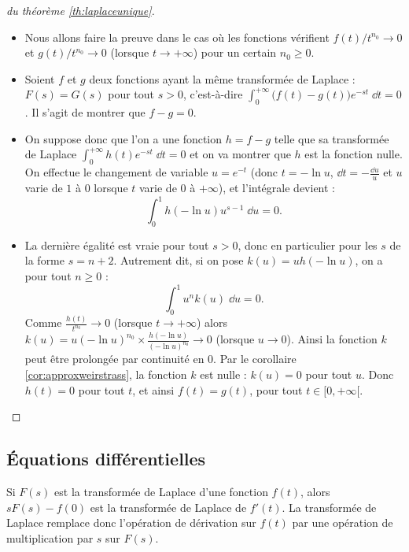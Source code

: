 \documentclass[class=report,crop=false]{standalone}
\begin{document}
\begin{proof}[du théorème \ref{th:laplaceunique}]
\begin{itemize}
  \item Nous allons faire la preuve dans le cas où les fonctions vérifient
  $f(t)/t^{n_0} \to 0$ et $g(t)/t^{n_0} \to 0$ (lorsque $t\to+\infty$) 
  pour un certain $n_0\ge0$.

  \item Soient $f$ et $g$ deux fonctions ayant la même transformée de Laplace :
  $F(s)=G(s)$ pour tout $s>0$, c'est-à-dire 
  $\int_0^{+\infty} \big( f(t)-g(t) \big) e^{-st}\;\dd t=0$. Il s'agit de montrer 
  que $f-g = 0$.
  
  \item On suppose donc que l'on a une fonction $h=f-g$ telle que sa transformée de Laplace
  $\int_0^{+\infty} h(t) e^{-st}\;\dd t=0$ et on va montrer que $h$ est la fonction nulle.
  On effectue le changement de variable $u=e^{-t}$ (donc $t=-\ln u$, 
  $\dd t = -\frac{\dd u}{u}$ et $u$ varie de $1$ à $0$ lorsque 
  $t$ varie de $0$ à $+\infty$), et l'intégrale devient :
  $$\int_0^1 h(-\ln u) u^{s-1} \; \dd u = 0.$$
  
  \item La dernière égalité est vraie pour tout $s>0$, donc en particulier pour les 
  $s$ de la forme $s=n+2$. Autrement dit, si on pose 
  $k(u) = uh(-\ln u)$, on a pour tout $n\ge0$ :
  $$\int_0^1 u^n k(u)  \; \dd u = 0.$$
  Comme $\frac{h(t)}{t^{n_0}} \to 0$ (lorsque $t\to+\infty$) alors
  $k(u) = u(-\ln u)^{n_0} \times \frac{h(-\ln u)}{(-\ln u)^{n_0}}\to 0$ (lorsque $u\to0$).
  Ainsi la fonction $k$
  peut être prolongée par continuité en $0$.
  Par le corollaire \ref{cor:approxweirstrass}, la fonction $k$ est nulle : $k(u)=0$ pour tout $u$.
  Donc $h(t)=0$ pour tout $t$, et ainsi $f(t)=g(t)$, pour tout $t\in[0,+\infty[$.
  
\end{itemize}
 
  
\end{proof}



\subsection{\'Equations différentielles}

Si $F(s)$ est la transformée de Laplace d'une fonction $f(t)$,
alors $sF(s)-f(0)$ est la transformée de Laplace de $f'(t)$.
La transformée de Laplace remplace donc l'opération de dérivation sur
$f(t)$ par une opération de multiplication par $s$ sur $F(s)$.
\end{document}
